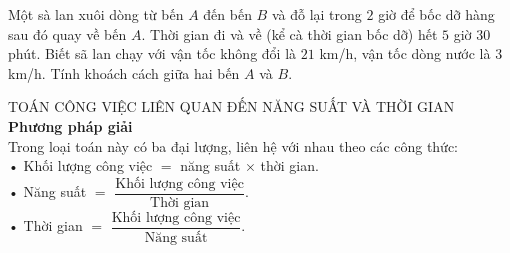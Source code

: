 \begin{vd}%
Một sà lan xuôi dòng từ bến $A$ đến bến $B$ và đỗ lại trong $2$ giờ để bốc dỡ hàng sau đó quay về bến $A$. Thời gian đi và về (kể cà thời gian bốc dỡ) hết $5$ giờ $30$ phút. Biết sã lan chạy với vận tốc không đổi là $21$ km/h, vận tốc dòng nước là $3$ km/h. Tính khoách cách giữa hai bến $A$ và $B$.
\end{vd}
\begin{dang}{TOÁN CÔNG VIỆC LIÊN QUAN ĐẾN NĂNG SUẤT VÀ THỜI GIAN}
\textbf{Phương pháp giải} \\
Trong loại toán này có ba đại lượng, liên hệ với nhau theo các công thức:  \\
• Khối lượng công việc $=$  năng suất $\times$ thời gian. \\
• Năng suất $=$ $\dfrac{\textrm{Khối lượng công việc}}{\textrm{Thời gian}}$. \\
• Thời gian $=$ $\dfrac{\textrm{Khối lượng công việc}}{\textrm{Năng suất}}$. 
\end{dang}

